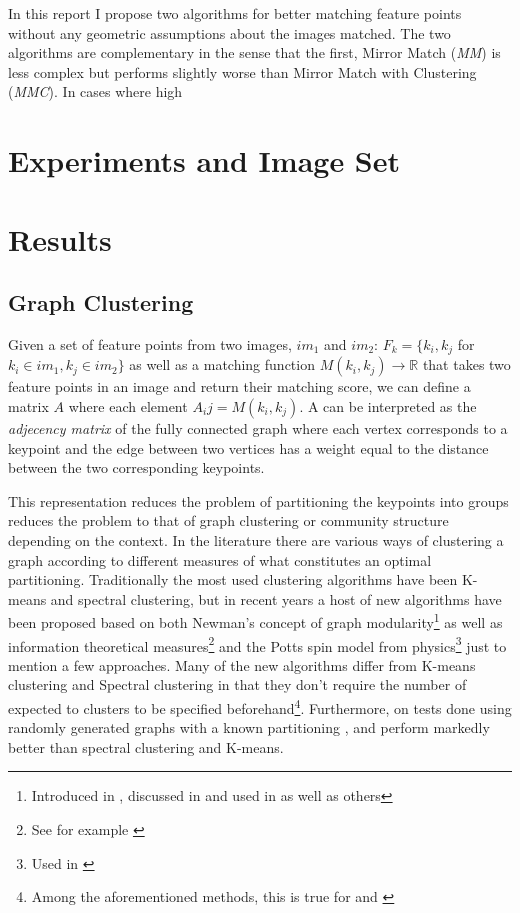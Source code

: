 \documentclass{article}
\begin{document}
In this report I propose two algorithms for better matching feature 
points without any geometric assumptions about the images matched. The 
two algorithms are complementary in the sense that the first, Mirror 
Match (\emph{MM}) is less complex but performs slightly worse than 
Mirror Match with Clustering (\emph{MMC}). In cases where high 


\section{Experiments and Image Set}
\label{experiment}

\section{Results}
\label{results}
\subsection{Graph Clustering}

Given a set of feature points from two images, $im_1$ and $im_2$: $F_k = 
\{k_i, k_j$ for $k_i \in im_1, k_j \in im_2\}$ as well as a matching 
function $M(k_i, k_j) \rightarrow \mathbb{R}$ that takes two feature 
points in an image and return their matching score, we can define a 
matrix $A$ where each element $A_ij = M(k_i, k_j)$. A can be interpreted 
as the \emph{adjecency matrix} of the fully connected graph where each 
vertex corresponds to a keypoint and the edge between two vertices has a 
weight equal to the distance between the two corresponding keypoints.

This representation reduces the problem of partitioning the keypoints 
into groups reduces the problem to that of graph clustering or community 
structure depending on the context. In the literature there are various 
ways of clustering a graph according to different measures of what 
constitutes an optimal partitioning. Traditionally the most used 
clustering algorithms have been K-means and spectral clustering, but in 
recent years a host of new algorithms have been proposed based on both 
Newman's concept of graph modularity\footnote{Introduced in 
\cite{girvan2002}, discussed in \cite{brandes2007} and used in 
\cite{blondel2008} as well as others} as well as information theoretical 
measures\footnote{See for example \cite{rosvall2008}} and the Potts spin 
model from physics\footnote{Used in \cite{ronhovde2009}} just to mention 
a few approaches. Many of the new algorithms differ from K-means 
clustering and Spectral clustering in that they don't require the number 
of expected to clusters to be specified beforehand\footnote{Among the 
aforementioned methods, this is true for \cite{blondel2008} and 
\cite{rosvall2008}}.  Furthermore, on tests done using randomly 
generated graphs with a known partitioning \cite{blondel2008}, 
\cite{rosvall2008} and \cite{ronhovde2009} perform markedly better than 
spectral clustering and K-means\cite{lancichinetti2009}.
\end{document}
